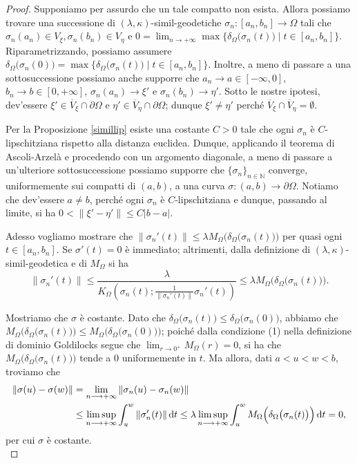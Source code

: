 \begin{proof}
    Supponiamo per assurdo che un tale compatto non esista. Allora possiamo trovare una successione di $(\lambda,\kappa)$-simil-geodetiche $\sigma_n:[a_n,b_n]\longrightarrow\Omega$ tali che $\sigma_n(a_n)\in V_\xi,\sigma_n(b_n)\in V_\eta$ e $\displaystyle0=\lim_{n\rightarrow+\infty}\max\{\delta_\Omega\big(\sigma_n(t)\big) \mid t\in[a_n,b_n]\}$. Riparametrizzando, possiamo assumere $\delta_\Omega\big(\sigma_n(0)\big)=\max\{\delta_\Omega\big(\sigma_n(t)\big) \mid t\in[a_n,b_n]\}$. Inoltre, a meno di passare a una sottosuccessione possiamo anche supporre che $a_n \longrightarrow a\in[-\infty,0]$, $b_n \longrightarrow b\in[0,+\infty]$, $\sigma_n(a_n)\longrightarrow \xi'$ e $\sigma_n(b_n)\longrightarrow\eta'$. Sotto le nostre ipotesi, dev'essere $\xi'\in\overline{V}_\xi\cap\partial\Omega$ e $\eta'\in\overline{V}_\eta\cap\partial\Omega$; dunque $\xi'\not=\eta'$ perché $\overline{V}_\xi\cap\overline{V}_\eta=\emptyset$.

    Per la Proposizione \ref{simillip} esiste una costante $C>0$ tale che ogni $\sigma_n$ è $C$-lipschitziana rispetto alla distanza euclidea. Dunque, applicando il teorema di Ascoli-Arzelà e procedendo con un argomento diagonale, a meno di passare a un'ulteriore sottosuccessione possiamo supporre che $\{\sigma_n\}_{n\in\mathbb{N}}$ converge, uniformemente sui compatti di $(a,b)$, a una curva $\sigma:(a,b)\longrightarrow\partial\Omega$. Notiamo che dev'essere $a\not=b$, perché ogni $\sigma_n$ è $C$-lipschitziana e dunque, passando al limite, si ha $0<\|\xi'-\eta'\|\le C|b-a|$.
    
    Adesso vogliamo mostrare che $\|\sigma_n'(t)\| \le \lambda M_\Omega\Big(\delta_\Omega\big(\sigma_n(t)\big)\Big)$ per quasi ogni $t\in[a_n,b_n]$. Se $\sigma'(t)=0$ è immediato; altrimenti, dalla definizione di $(\lambda,\kappa)$-simil-geodetica e di $M_\Omega$ si ha
    $$\|\sigma_n'(t)\| \le \frac{\lambda}{K_\Omega\left(\sigma_n(t);\frac{1}{\|\sigma_n'(t)\|}\sigma_n'(t)\right)} \le \lambda M_\Omega\Big(\delta_\Omega\big(\sigma_n(t)\big)\Big).$$

    Mostriamo che $\sigma$ è costante. Dato che $\delta_\Omega\big(\sigma_n(t)\big) \le \delta_\Omega\big(\sigma_n(0)\big)$, abbiamo che $M_\Omega\Big(\delta_\Omega\big(\sigma_n(t)\big)\Big) \le M_\Omega\Big(\delta_\Omega\big(\sigma_n(0)\big)\Big)$; poiché dalla condizione (1) nella definizione di dominio Goldilocks segue che $\displaystyle\lim_{r\longrightarrow 0^+}M_\Omega(r)=0$, si ha che $M_\Omega\Big(\delta_\Omega\big(\sigma_n(t)\big)\Big)$ tende a $0$ uniformemente in $t$. Ma allora, dati $a<u<w<b$, troviamo che
    \begin{align*}
        \|\sigma(u)-\sigma(w)\|&=\lim_{n\longrightarrow+\infty}\|\sigma_n(u)-\sigma_n(w)\| \\
        &\le \limsup_{n\longrightarrow+\infty}\int_u^w \|\sigma_n'(t)\|\mathop{}\!\mathrm{d} t \le \lambda\limsup_{n\longrightarrow+\infty}\int_u^w M_\Omega\Big(\delta_\Omega\big(\sigma_n(t)\big)\Big) \mathop{}\!\mathrm{d} t=0,
    \end{align*}
    per cui $\sigma$ è costante. \\


\end{proof}
